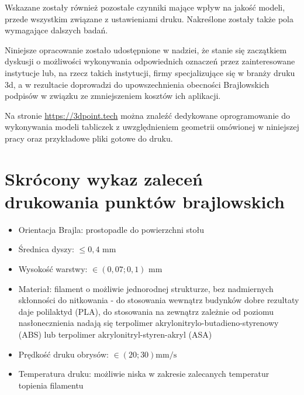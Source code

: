 \documentclass[12pt,a4paper]{article}
\begin{document}
Wskazane zostały również pozostałe czynniki mające wpływ na jakość modeli, przede wszystkim związane z ustawieniami druku. Nakreślone zostały także pola wymagające dalszych badań.

Niniejsze opracowanie zostało udostępnione w nadziei, że stanie się zaczątkiem dyskusji o możliwości wykonywania odpowiednich oznaczeń przez zainteresowane instytucje lub, na rzecz takich instytucji, firmy specjalizujące się w branży druku 3d, a w rezultacie doprowadzi do upowszechnienia obecności Brajlowskich podpisów w związku ze zmniejszeniem kosztów ich aplikacji.

Na stronie \url{https://3dpoint.tech} można znaleźć dedykowane oprogramowanie do wykonywania modeli tabliczek z uwzględnieniem geometrii omówionej w niniejszej pracy oraz przykładowe pliki gotowe do druku.

\newpage

\section*{Skrócony wykaz zaleceń drukowania punktów brajlowskich}
\label{sec:recommendations}
\begin{itemize}
\item Orientacja Brajla: prostopadle do powierzchni stołu
\item Średnica dyszy: $\leq 0{,}4 \text{ mm}$
\item Wysokość warstwy: $\in (0{,}07; 0{,}1) \text{ mm}$
\item Materiał: filament o możliwie jednorodnej strukturze, bez nadmiernych skłonności do nitkowania - do stosowania wewnątrz budynków dobre rezultaty daje polilaktyd (PLA), do stosowania na zewnątrz zależnie od poziomu nasłonecznienia nadają się terpolimer akrylonitrylo-butadieno-styrenowy (ABS) lub terpolimer akrylonitryl-styren-akryl (ASA)
\item Prędkość druku obrysów: $\in (20; 30) \text{mm/s}$
\item Temperatura druku: możliwie niska w zakresie zalecanych temperatur topienia filamentu
\end{itemize}

\newpage
\end{document}
